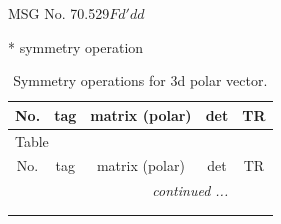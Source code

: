 \documentclass[fleqn,8pt]{jsarticle}
\begin{document}
\setcounter{MaxMatrixCols}{32}

\renewcommand{\tablename}{Table~}
\renewcommand{\figurename}{Figure~}
\begin{center}
\LARGE
MSG No. 70.529\quad$Fd'dd$
\end{center}
* symmetry operation
\renewcommand{\arraystretch}{1.3}
\begin{longtable}{ccccc}
\caption{Symmetry operations for 3d polar vector.}
 \\
 \hline \hline
No. & tag & matrix (polar) & det & TR \\ \hline \endfirsthead

\multicolumn{4}{l}{\tablename\ \thetable{}} \\
 \hline \hline
No. & tag & matrix (polar) & det & TR \\ \hline \endhead

 \hline \hline
\multicolumn{4}{r}{\footnotesize\it continued ...} \\ \endfoot

 \hline \hline
\multicolumn{4}{r}{} \\ \endlastfoot


\end{longtable}
\end{document}
